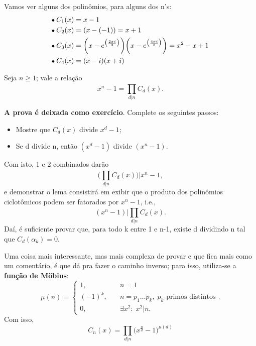 \documentclass[../algebraIII_notes.tex]{subfiles}
\begin{document}
\begin{example}
	Vamos ver alguns dos polinômios, para alguns dos n's:
	\begin{align*}
		 & \tikz[baseline=-0.5ex]\draw[black, fill=black, radius=1.5pt](0, 0)circle;\; C_{1}(x) = x-1                                                                                                          \\
		 & \tikz[baseline=-0.5ex]\draw[black, fill=black, radius=1.5pt](0, 0)circle;\; C_{2}(x) = (x-(-1))=x+1                                                                                                 \\
		 & \tikz[baseline=-0.5ex]\draw[black, fill=black, radius=1.5pt](0, 0)circle;\; C_{3}(x) = \biggl(x-e^{\bigl(\frac{2\pi i}{3}\bigr)}\biggr)\biggl(x-e^{\bigl(\frac{4\pi i}{3}\bigr)}\biggr) = x^{2}-x+1 \\
		 & \tikz[baseline=-0.5ex]\draw[black, fill=black, radius=1.5pt](0, 0)circle;\; C_{4}(x) = (x-i)(x+i)
	\end{align*}
\end{example}
\begin{lemma*}
	Seja \(n\geq 1\); vale a relação
	\[
		x^{n}-1 = \prod\limits_{d | n}^{}C_{d}(x).
	\]
\end{lemma*}
\begin{proof*}
	\textbf{A prova é deixada como exercício}. Complete os seguintes passos:
	\begin{itemize}
		\item[1)] Mostre que \(C_{d}(x)\) divide \(x^{d}-1\);
		\item[2)] Se d divide n, então \((x^{d}-1)\) divide \((x^{n}-1)\).
	\end{itemize}
	Com isto, 1 e 2 combinados darão
	\[
		\biggl(\prod\limits_{d|n}^{}C_{d}(x)\biggr) | x^{n}-1,
	\]
	e demonstrar o lema consistirá em exibir que o produto dos polinômios ciclotômicos podem ser fatorados por \(x^{n}-1\), i.e.,
	\[
		(x^{n}-1)| \prod\limits_{d|n}^{}C_d(x).
	\]
	Daí, é suficiente provar que, para todo k entre 1 e n-1, existe d dividindo n tal que \(C_{d}(\alpha_{k}) = 0.\) \qedsymbol
\end{proof*}
Uma coisa mais interessante, mas mais complexa de provar e que fica mais como um comentário, é que dá pra fazer o caminho inverso; para isso, utiliza-se a \textbf{função de Möbius}:
\[
	\mu (n)  = \left\{\begin{array}{ll}
		1,        & \quad n=1                                                 \\
		(-1)^{k}, & \quad n = p_1 \dotsc p_k,\; p_{k}\text{ primos distintos} \\
		0,        & \quad \exists x^{2}:\; x^{2}| n.
	\end{array}\right..
\]
Com isso,
\[
	\boxed{C_{n}(x) = \prod\limits_{d | n}^{}\biggl(x^{\frac{n}{d}}-1\biggr)^{\mu (d)}}
\]
\end{document}
